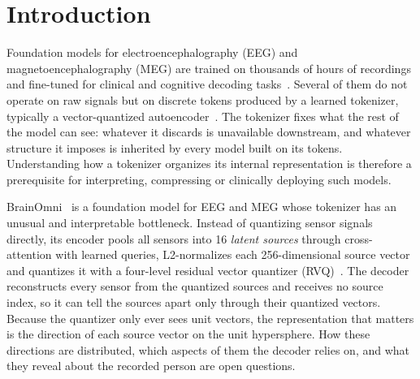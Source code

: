 \documentclass[10pt,letterpaper]{article}
\begin{document}

\linenumbers

\section*{Introduction}\label{sec:intro}

Foundation models for electroencephalography (EEG) and magnetoencephalography (MEG)
are trained on thousands of hours of recordings and fine-tuned for clinical and
cognitive decoding tasks~\cite{labram2024,biot2023,wang2025cbramod,wang2024eegpt,jiang2025neurolm,elouahidi2025reve}.
Several of them do not operate on raw signals but on discrete tokens produced by a
learned tokenizer, typically a vector-quantized autoencoder~\cite{vqvae2017,labram2024,jiang2025neurolm,ma2026codebrain}. The tokenizer fixes
what the rest of the model can see: whatever it discards is unavailable downstream,
and whatever structure it imposes is inherited by every model built on its tokens.
Understanding how a tokenizer organizes its internal representation is therefore a
prerequisite for interpreting, compressing or clinically deploying such models.

BrainOmni~\cite{brainomni2025} is a foundation model for EEG and MEG whose tokenizer
has an unusual and interpretable bottleneck. Instead of quantizing sensor signals
directly, its encoder pools all sensors into 16 \emph{latent sources} through
cross-attention with learned queries, L2-normalizes each 256-dimensional source
vector and quantizes it with a four-level residual vector quantizer (RVQ)~\cite{juang1982multistage,soundstream2021,encodec2022}. The decoder reconstructs every
sensor from the quantized sources and receives no source index, so it can tell the sources apart
only through their quantized vectors. Because the quantizer only ever sees unit vectors,
the representation that matters is the direction of each source vector on the unit
hypersphere. How these directions are distributed, which aspects of them the decoder
relies on, and what they reveal about the recorded person are open questions.
\end{document}
